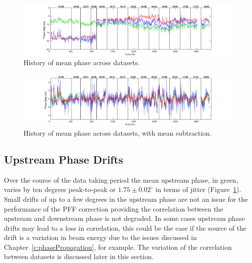 \begin{landscape}

\begin{figure}
  \centering
  \includegraphics[width=\hsize]{Figures/feedforward/longFF_noMeanSubHistory}
  \caption{History of mean phase across datasets.}
  \label{f:longFF_noMeanSubHistory}
\end{figure}


\begin{figure}
  \centering
  \includegraphics[width=\hsize]{Figures/feedforward/longFF_history}
  \caption{History of mean phase across datasets, with mean subtraction.}
  \label{f:longFF_history}
\end{figure}

\end{landscape}

\subsection{Upstream Phase Drifts}
\label{ss:longFF_upDrifts}

Over the course of the data taking period the mean upstream phase, in green, varies by 
ten degrees peak-to-peak or \(1.75 \pm 0.02^\circ\) in terms of jitter 
(Figure~\ref{f:longFF_noMeanSubHistory}). Small drifts of up to a few degrees in the upstream 
phase are not an issue for the performance of the PFF correction providing the 
correlation between the upstream and downstream phase is not degraded. In some cases 
upstream phase drifts may lead to a loss in correlation, this could be the case if the 
source of the drift is a variation in beam energy due to the issues discussed in 
Chapter~\ref{c:phasePropagation}, for example. 
The variation of the correlation between datasets is discussed later in this section.



